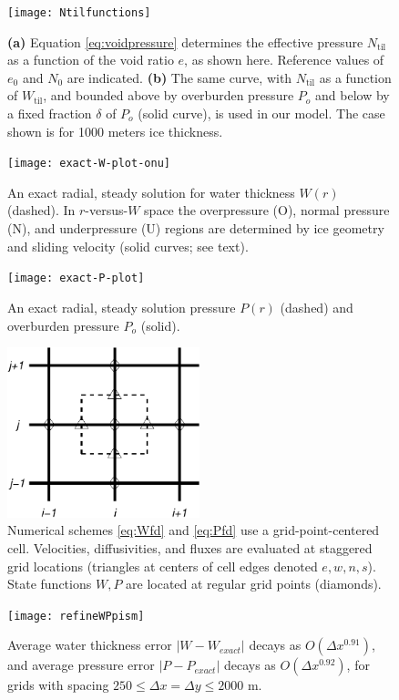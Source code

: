 \documentclass[gmd]{copernicus}   %
\newcommand{\text}{\textrm}
\newcommand{\Ntil}{N_{\text{til}}}
\newcommand{\Wtil}{W_{\text{til}}}
\begin{document}

\begin{figure}[ht]
\texttt{[image: Ntilfunctions]}
\caption{\textbf{(a)} Equation \eqref{eq:voidpressure} determines the effective pressure $\Ntil$ as a function of the void ratio $e$, as shown here.  Reference values of $e_0$ and $N_0$ are indicated.  \textbf{(b)}  The same curve, with $\Ntil$ as a function of $\Wtil$, and  bounded above by overburden pressure $P_o$ and below by a fixed fraction $\delta$ of $P_o$ (solid curve), is used in our model.  The case shown is for 1000 meters ice thickness.}
\label{fig:Ntilfunctions}
\end{figure}

\begin{figure}[ht]
\texttt{[image: exact-W-plot-onu]}
\caption{An exact radial, steady solution for water thickness $W(r)$ (dashed).  In $r$-versus-$W$ space the overpressure (O), normal pressure (N), and underpressure (U) regions are determined by ice geometry and sliding velocity (solid curves; see text).}
\label{fig:Wexact}
\end{figure}

\begin{figure}[ht]
\texttt{[image: exact-P-plot]}
\caption{An exact radial, steady solution pressure $P(r)$ (dashed) and overburden pressure $P_o$ (solid).}
\label{fig:Pexact}
\end{figure}

\begin{figure}[ht]
\centering
\includegraphics[width=2.2in,keepaspectratio=true]{diffstencil}
\bigskip
\caption{Numerical schemes \eqref{eq:Wfd} and \eqref{eq:Pfd} use a grid-point-centered cell.  Velocities, diffusivities, and fluxes are evaluated at staggered grid locations (triangles at centers of cell edges denoted $e,w,n,s$).  State functions $W,P$ are located at regular grid points (diamonds).}
\label{fig:stencil}
\end{figure}

\begin{figure}[ht]
\texttt{[image: refineWPpism]}
\caption{Average water thickness error $|W-W_{exact}|$ decays as $O(\Delta x^{0.91})$, and average pressure error $|P-P_{exact}|$ decays as $O(\Delta x^{0.92})$, for grids with spacing $250 \le \Delta x = \Delta y \le 2000$ m.}
\label{fig:refineWPpism}
\end{figure}
\end{document}
